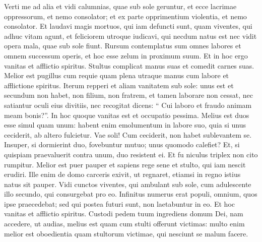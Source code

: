 \begin{biblechapter}
\begin{biblechapter}
\begin{biblechapter}
\begin{biblechapter}
\verse Verti me ad alia et vidi calumnias, quae sub sole geruntur, et ecce lacrimae oppressorum, et nemo consolator; et ex parte opprimentium violentia, et nemo consolator. 
\verse Et laudavi magis mortuos, qui iam defuncti sunt, quam viventes, qui adhuc vitam agunt, 
\verse et feliciorem utroque iudicavi, qui necdum natus est nec vidit opera mala, quae sub sole fiunt.
 \verse Rursum contemplatus sum omnes labores et omnem successum operis, et hoc esse zelum in proximum suum. Et in hoc ergo vanitas et afflictio spiritus.
 \verse Stultus complicat manus suas
 et comedit carnes suas.
 \verse Melior est pugillus cum requie
 quam plena utraque manus cum labore et afflictione spiritus.
 \verse Iterum repperi et aliam vanitatem sub sole: 
\verse unus est et secundum non habet, non filium, non fratrem, et tamen laborare non cessat, nec satiantur oculi eius divitiis, nec recogitat dicens: “ Cui laboro et fraudo animam meam bonis?”. In hoc quoque vanitas est et occupatio pessima. 
\verse Melius est duos esse simul quam unum: habent enim emolumentum in labore suo, 
\verse quia si unus ceciderit, ab altero fulcietur. Vae soli! Cum ceciderit, non habet sublevantem se. 
\verse Insuper, si dormierint duo, fovebuntur mutuo; unus quomodo calefiet? 
 \verse Et, si quispiam praevaluerit contra unum, duo resistent ei. Et fu niculus triplex non cito rumpitur. 
\verse Melior est puer pauper et sapiens
 rege sene et stulto,
 qui iam nescit erudiri.
 \verse Ille enim de domo carceris exivit, ut regnaret, etiamsi in regno istius natus sit pauper. 
\verse Vidi cunctos viventes, qui ambulant sub sole, cum adulescente illo secundo, qui consurgebat pro eo. \verse Infinitus numerus erat populi, omnium, quos ipse praecedebat; sed qui postea futuri sunt, non laetabuntur in eo. Et hoc vanitas et afflictio spiritus.
 \verse Custodi pedem tuum ingrediens domum Dei, nam accedere, ut audias, melius est quam cum stulti offerunt victimas: multo enim melior est oboedientia quam stultorum victimae, qui nesciunt se malum facere.
 

\end{biblechapter}
\end{biblechapter}
\end{biblechapter}
\end{biblechapter}
